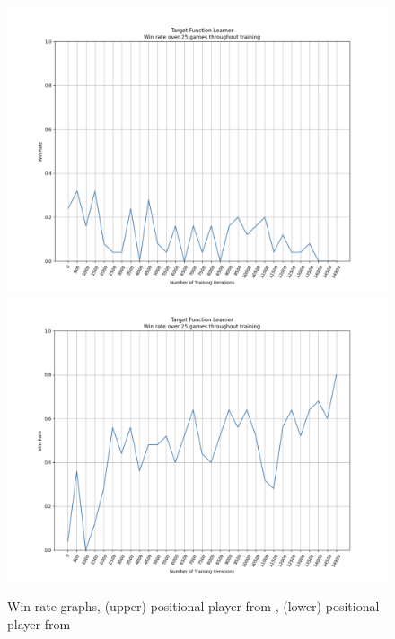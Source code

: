 \documentclass{article}
\begin{document}
\begin{figure}[ht]
    \centering
    \includegraphics[width=0.99\linewidth]{figures/8x8_win_rate_our_positional_player.png}
    \includegraphics[width=0.99\linewidth]{figures/8x8_win_rate_their_positional_player.png}
    \caption{\label{fig:winning_rates}Win-rate graphs, (upper) positional player from \cite{vanEck2008}, (lower) positional player from \cite{codes}}
\end{figure}
\end{document}
